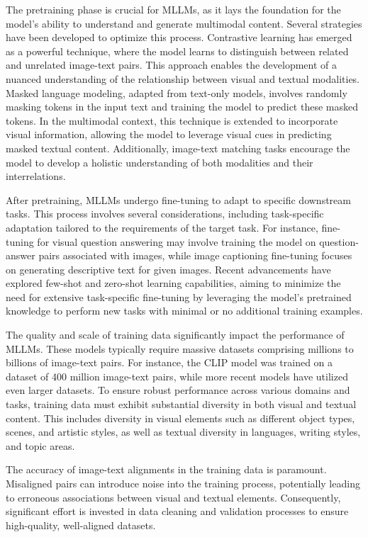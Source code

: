 The pretraining phase is crucial for MLLMs, as it lays the foundation for the model's ability to understand and generate multimodal content. Several strategies have been developed to optimize this process. Contrastive learning has emerged as a powerful technique, where the model learns to distinguish between related and unrelated image-text pairs. This approach enables the development of a nuanced understanding of the relationship between visual and textual modalities. Masked language modeling, adapted from text-only models, involves randomly masking tokens in the input text and training the model to predict these masked tokens. In the multimodal context, this technique is extended to incorporate visual information, allowing the model to leverage visual cues in predicting masked textual content. Additionally, image-text matching tasks encourage the model to develop a holistic understanding of both modalities and their interrelations.

After pretraining, MLLMs undergo fine-tuning to adapt to specific downstream tasks. This process involves several considerations, including task-specific adaptation tailored to the requirements of the target task. For instance, fine-tuning for visual question answering may involve training the model on question-answer pairs associated with images, while image captioning fine-tuning focuses on generating descriptive text for given images. Recent advancements have explored few-shot and zero-shot learning capabilities, aiming to minimize the need for extensive task-specific fine-tuning by leveraging the model's pretrained knowledge to perform new tasks with minimal or no additional training examples.

The quality and scale of training data significantly impact the performance of MLLMs. These models typically require massive datasets comprising millions to billions of image-text pairs. For instance, the CLIP model was trained on a dataset of 400 million image-text pairs, while more recent models have utilized even larger datasets. To ensure robust performance across various domains and tasks, training data must exhibit substantial diversity in both visual and textual content. This includes diversity in visual elements such as different object types, scenes, and artistic styles, as well as textual diversity in languages, writing styles, and topic areas.

The accuracy of image-text alignments in the training data is paramount. Misaligned pairs can introduce noise into the training process, potentially leading to erroneous associations between visual and textual elements. Consequently, significant effort is invested in data cleaning and validation processes to ensure high-quality, well-aligned datasets.

